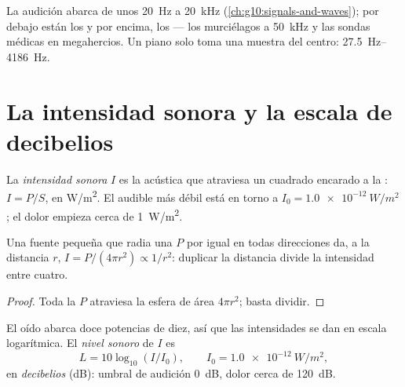 \begin{remark}\label{rem:g12:sound-acoustics:audible}
La audición abarca de unos \qty{20}{Hz} a \qty{20}{kHz}
(\cref{ch:g10:signals-and-waves}); por debajo están los  y
por encima, los  --- los murciélagos a \qty{50}{kHz} y las
sondas médicas en megahercios. Un piano solo toma una muestra del
centro: \qtyrange{27.5}{4186}{Hz}.
\end{remark}

\section{La intensidad sonora y la escala de decibelios}

\begin{definition}\label{def:g12:sound-acoustics:intensity}
La \emph{intensidad sonora} $I$ es la 
acústica que atraviesa un  cuadrado encarado a la :
$I = P/S$, en \unit{W/m^2}. El  audible más débil está en torno a
$I_0 = \qty{1.0e-12}{W/m^2}$; el dolor empieza cerca de
\qty{1}{W/m^2}.
\end{definition}

\begin{proposition}\label{prop:g12:sound-acoustics:inverse-square}
%
Una fuente pequeña que radia una  $P$ por igual en todas
direcciones da, a la distancia $r$,
$I = P/(4\pi r^2) \propto 1/r^2$: duplicar la distancia divide la
intensidad entre cuatro.
\end{proposition}

\begin{proof}
Toda la  $P$ atraviesa la esfera de área $4\pi r^2$; basta
dividir.
\end{proof}

\begin{definition}\label{def:g12:sound-acoustics:level}
El oído abarca doce potencias de diez, así que las intensidades se dan
en escala logarítmica. El \emph{nivel sonoro} de $I$
es
\[ L = 10 \log_{10}(I/I_0), \qquad I_0 = \qty{1.0e-12}{W/m^2}, \]
en \emph{decibelios} (\unit{dB}): umbral de audición
\qty{0}{dB}, dolor cerca de \qty{120}{dB}.
\end{definition}

